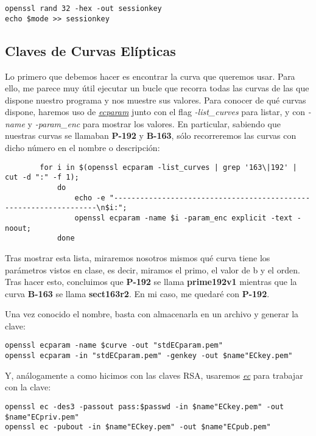 \documentclass[a4paper, 11pt]{article}
\begin{document}
		\begin{small}
			\verb|openssl rand 32 -hex -out sessionkey| \\
			\verb|echo $mode >> sessionkey|
		\end{small}
		
	\subsection{Claves de Curvas Elípticas}
		Lo primero que debemos hacer es encontrar la curva que queremos usar. Para ello, me parece muy útil ejecutar un
		bucle que recorra todas las curvas de las que dispone nuestro programa y nos muestre sus valores. Para conocer
		de qué curvas dispone, haremos uso de \href{https://www.openssl.org/docs/man1.0.2/apps/ecparam.html}
		{\textit{ecparam}} junto con el flag \textit{-list\_curves} para listar, y con \textit{-name} y \textit{-param\_enc}
		para mostrar los valores. En particular, sabiendo que nuestras curvas se llamaban \textbf{P-192} y \textbf{B-163},
		sólo recorreremos las curvas con dicho número en el nombre o descripción:
		\begin{verbatim}
		for i in $(openssl ecparam -list_curves | grep '163\|192' | cut -d ":" -f 1);
			do
				echo -e "------------------------------------------------------------------\n$i:";
				openssl ecparam -name $i -param_enc explicit -text -noout;
			done
		\end{verbatim}
		
		Tras mostrar esta lista, miraremos nosotros mismos qué curva tiene los parámetros vistos en clase, es decir,
		miramos el primo, el valor de b y el orden. Tras hacer esto, concluimos que \textbf{P-192} se llama
		\textbf{prime192v1} mientras que la curva \textbf{B-163} se llama \textbf{sect163r2}. En mi caso, me quedaré
		con \textbf{P-192}.
		
		Una vez conocido el nombre, basta con almacenarla en un archivo y generar la clave:		
		\begin{small}
			\verb|openssl ecparam -name $curve -out "stdECparam.pem"| \\
			\verb|openssl ecparam -in "stdECparam.pem" -genkey -out $name"ECkey.pem"|
		\end{small}
		
		Y, análogamente a como hicimos con las claves RSA, usaremos \href{https://www.openssl.org/docs/man1.0.2/apps/ec.html}
		{\textit{ec}} para trabajar con la clave: \\
		\begin{small}
			\verb|openssl ec -des3 -passout pass:$passwd -in $name"ECkey.pem" -out $name"ECpriv.pem"| \\
			\verb|openssl ec -pubout -in $name"ECkey.pem" -out $name"ECpub.pem"|
		\end{small}
	
\end{document}

